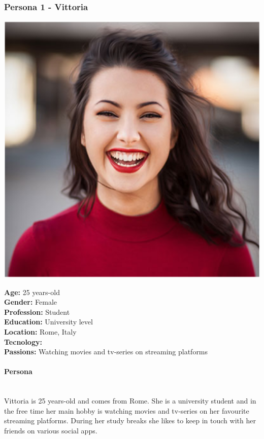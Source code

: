 \documentclass[12pt, a4paper]{article}
\begin{document}
\subsubsection{Persona 1 - Vittoria}

\begin{minipage}{0.25\textwidth}
	\includegraphics[width=1\textwidth]{images/vittoria.png}
\end{minipage}
\hspace{0.02\linewidth}
\begin{minipage}{0.7\textwidth} 
	\textbf{Age:} 25 years-old \\
	\textbf{Gender:} Female\\
	\textbf{Profession:} Student\\
	\textbf{Education:} University level\\
	\textbf{Location:} Rome, Italy\\
	\textbf{Tecnology:} \\
	\textbf{Passions:} Watching movies and tv-series on streaming platforms \\
\end{minipage}

\paragraph{Persona}\mbox{}\\
Vittoria is 25 years-old and comes from Rome. She is a university student and in the free 
time her main hobby is watching movies and tv-series on her favourite streaming platforms. 
During her study breaks she likes to keep in touch with her friends on various social apps.
\end{document}
